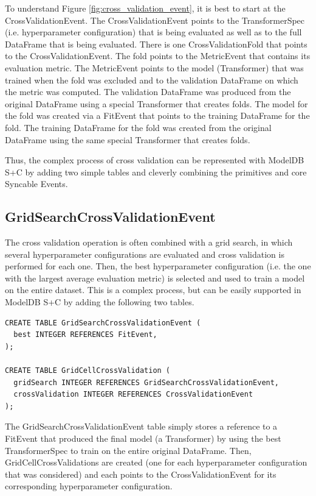 To understand Figure \ref{fig:cross_validation_event}, it is best to start at the CrossValidationEvent.
The CrossValidationEvent points to the TransformerSpec (i.e. hyperparameter configuration) that is being evaluated
as well as to the full DataFrame that is being evaluated. There is one CrossValidationFold that points to the
CrossValidationEvent. The fold points to the MetricEvent that contains its evaluation metric. The MetricEvent
points to the model (Transformer) that was trained when the fold was excluded and to the validation DataFrame
on which the metric was computed. The validation DataFrame was produced from the original DataFrame using a special
Transformer that creates folds. The model for the fold was created via a FitEvent that points to the training DataFrame
for the fold. The training DataFrame for the fold was created from the original DataFrame using the same special Transformer that
creates folds.

Thus, the complex process of cross validation can be represented with ModelDB S+C by adding two simple tables and cleverly
combining the primitives and core Syncable Events.

\subsection{GridSearchCrossValidationEvent}
The cross validation operation is often combined with a grid search, in which several hyperparameter configurations
are evaluated and cross validation is performed for each one. Then, the best hyperparameter configuration (i.e. the one with the largest
average evaluation metric) is selected and used to train a model on the entire dataset. This is a complex process, but can be easily
supported in ModelDB S+C by adding the following two tables.

\begin{verbatim}
CREATE TABLE GridSearchCrossValidationEvent (
  best INTEGER REFERENCES FitEvent,
);

CREATE TABLE GridCellCrossValidation (
  gridSearch INTEGER REFERENCES GridSearchCrossValidationEvent,
  crossValidation INTEGER REFERENCES CrossValidationEvent
);
\end{verbatim}

The GridSearchCrossValidationEvent table simply stores a reference to a FitEvent
that produced the final model (a Transformer) by using the best TransformerSpec to
train on the entire original DataFrame. Then, GridCellCrossValidations are created
(one for each hyperparameter configuration that was considered) and each points to
the CrossValidationEvent for its corresponding hyperparameter configuration.

